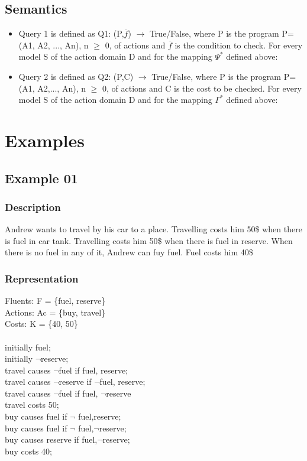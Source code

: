 \documentclass[11pt]{article}
\begin{document}
\subsection{Semantics}
\begin{itemize}
	\item{Query 1 is defined as Q1: (P,$\overline{f}$) $\rightarrow$ True/False, where P is the program P=(A1, A2, ..., An), n $\geq$ 0, of actions and $\overline{f}$ is the condition to check. For every model S of the action domain D and for the mapping $\Psi^{\ast}$ defined above: }
	\item{Query 2 is defined as Q2: (P,C) $\rightarrow$ True/False, where P is the program P=(A1, A2,..., An), n $\geq$ 0, of actions and C is the cost to be checked. For every model S of the action domain D and for the mapping $\Gamma^{\ast}$ defined above:}
\end{itemize}
	\section{Examples}\label{sec:Examples}
	\subsection{Example 01}\label{example:ex01}
	\subsubsection{Description}\label{par:p101}
	Andrew wants to travel by his car to a place. Travelling costs him 50\$ when there is fuel in car tank. Travelling costs him 50\$ when there is fuel in reserve. When there is no fuel in any of it, Andrew can fuy fuel. Fuel costs him 40\$
	\subsubsection{Representation}\label{par:p201}
	Fluents: F = \{fuel, reserve\}\\
	Actions: Ac = \{buy, travel\}\\
	Costs: K = \{40, 50\}\\
	\\
	initially  fuel; \\
	initially $\neg$reserve; \\
	travel causes $\neg$fuel if fuel, reserve; \\
	travel causes $\neg$reserve if $\neg$fuel, reserve;\\
	travel causes $\neg$fuel if fuel, $\neg$reserve\\
	travel costs 50; \\
	buy causes fuel if $\neg$ fuel,reserve;\\
	buy causes fuel if $\neg$ fuel,$\neg$reserve;\\
	buy causes reserve if  fuel,$\neg$reserve;\\
	buy costs 40; \\
\end{document}
